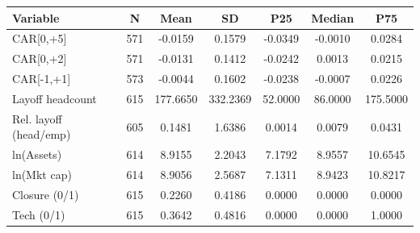 \begin{tabular}{lcccccc}
\toprule
Variable & N & Mean & SD & P25 & Median & P75 \\
\midrule
CAR[0,+5] & 571 & -0.0159 & 0.1579 & -0.0349 & -0.0010 & 0.0284 \\
CAR[0,+2] & 571 & -0.0131 & 0.1412 & -0.0242 & 0.0013 & 0.0215 \\
CAR[-1,+1] & 573 & -0.0044 & 0.1602 & -0.0238 & -0.0007 & 0.0226 \\
Layoff headcount & 615 & 177.6650 & 332.2369 & 52.0000 & 86.0000 & 175.5000 \\
Rel. layoff (head/emp) & 605 & 0.1481 & 1.6386 & 0.0014 & 0.0079 & 0.0431 \\
ln(Assets) & 614 & 8.9155 & 2.2043 & 7.1792 & 8.9557 & 10.6545 \\
ln(Mkt cap) & 614 & 8.9056 & 2.5687 & 7.1311 & 8.9423 & 10.8217 \\
Closure (0/1) & 615 & 0.2260 & 0.4186 & 0.0000 & 0.0000 & 0.0000 \\
Tech (0/1) & 615 & 0.3642 & 0.4816 & 0.0000 & 0.0000 & 1.0000 \\
\bottomrule
\end{tabular}